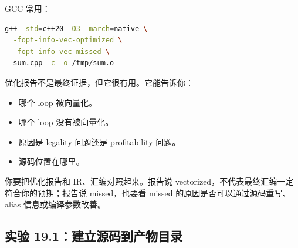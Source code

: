 GCC 常用：

\begin{lstlisting}[language=bash]
g++ -std=c++20 -O3 -march=native \
  -fopt-info-vec-optimized \
  -fopt-info-vec-missed \
  sum.cpp -c -o /tmp/sum.o
\end{lstlisting}

优化报告不是最终证据，但它很有用。它能告诉你：

\begin{itemize}
  \item 哪个 loop 被向量化。
  \item 哪个 loop 没有被向量化。
  \item 原因是 legality 问题还是 profitability 问题。
  \item 源码位置在哪里。
\end{itemize}

你要把优化报告和 IR、汇编对照起来。报告说 vectorized，不代表最终汇编一定符合你的预期；报告说 missed，也要看 missed 的原因是否可以通过源码重写、alias 信息或编译参数改善。

\subsection{实验 19.1：建立源码到产物目录}

